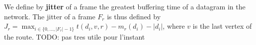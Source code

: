 \documentclass[10pt]{article}
\newcommand{\todo}[1]{{\color{red} TODO: {#1}}}
\begin{document}
     
           We define by {\bf jitter} of a frame the greatest buffering time of a datagram in the network. The jitter of a frame $F_r$ is thus defined by $ J_r =  \displaystyle \max_{i \in \{0,\ldots,|F_r|-1\}}  t(d_i,v,r) - m_r(d_i) - |d_i| $, where $v$ is the last vertex of the route.
      \todo{pas tres utile pour l'instant}
%   
%



\end{document}
